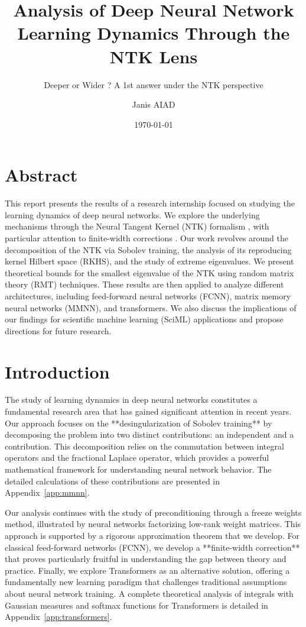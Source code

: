 \documentclass[a4paper]{article}
\author{Janis AIAD}
\date{\today}
\title{Analysis of Deep Neural Network Learning Dynamics Through the NTK Lens}
\subtitle{Deeper or Wider ? A 1st answer under the NTK perspective}
\newcommand{\Kop}{\textcolor{kernelcolor}{\mathbf{K}}}
\newcommand{\Pop}{\textcolor{sobolevcolor}{\mathbf{P}}}
\newcommand{\Kop}{\textcolor{kernelcolor}{\mathbf{K}}}
\newcommand{\Pop}{\textcolor{sobolevcolor}{\mathbf{P}}}
\newcommand{\Kop}{\textcolor{kernelcolor}{\mathbf{K}}}
\newcommand{\Pop}{\textcolor{sobolevcolor}{\mathbf{P}}}
\theoremstyle{plain}
\theoremstyle{definition}
\theoremstyle{remark}
\begin{document}
	\maketitle 
	
	\tableofcontents
\newpage

\section*{Abstract}
This report presents the results of a research internship focused on studying the learning dynamics of deep neural networks. We explore the underlying mechanisms through the Neural Tangent Kernel (NTK) formalism \cite{jacot2018neural}, with particular attention to finite-width corrections \cite{seleznova2022ntk_beyond}. Our work revolves around the decomposition of the NTK via Sobolev training, the analysis of its reproducing kernel Hilbert space (RKHS), and the study of extreme eigenvalues. We present theoretical bounds for the smallest eigenvalue of the NTK using random matrix theory (RMT) techniques. These results are then applied to analyze different architectures, including feed-forward neural networks (FCNN), matrix memory neural networks (MMNN), and transformers. We also discuss the implications of our findings for scientific machine learning (SciML) applications and propose directions for future research.

\newpage
{}


\newpage
{}
\section*{Introduction}

The study of learning dynamics in deep neural networks constitutes a fundamental research area that has gained significant attention in recent years. Our approach focuses on the **desingularization of Sobolev training** by decomposing the problem into two distinct contributions: an independent \Kop and a \Pop contribution. This decomposition relies on the commutation between integral operators and the fractional Laplace operator, which provides a powerful mathematical framework for understanding neural network behavior. The detailed calculations of these contributions are presented in Appendix~\ref{app:mmnn}.

Our analysis continues with the study of \Kop preconditioning through a freeze weights method, illustrated by neural networks factorizing low-rank weight matrices. This approach is supported by a rigorous approximation theorem that we develop. For classical feed-forward networks (FCNN), we develop a **finite-width correction** that proves particularly fruitful in understanding the gap between theory and practice. Finally, we explore Transformers as an alternative solution, offering a fundamentally new learning paradigm that challenges traditional assumptions about neural network training. A complete theoretical analysis of integrals with Gaussian measures and softmax functions for Transformers is detailed in Appendix~\ref{app:transformers}.
\end{document}
